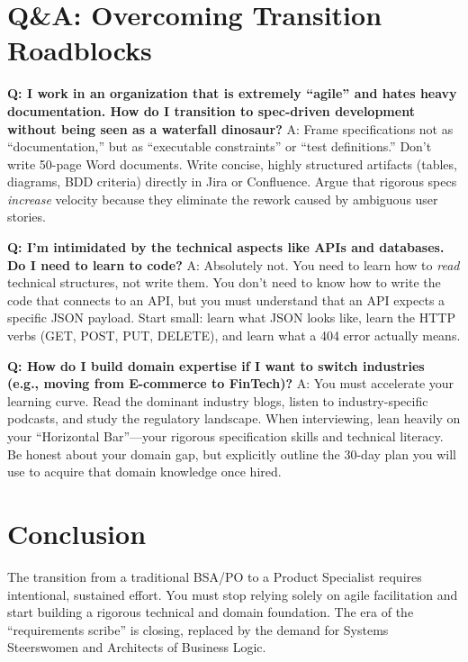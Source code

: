 \section{Q\&A: Overcoming Transition
Roadblocks}\label{qa-overcoming-transition-roadblocks}

\textbf{Q: I work in an organization that is extremely ``agile'' and
hates heavy documentation. How do I transition to spec-driven
development without being seen as a waterfall dinosaur?} A: Frame
specifications not as ``documentation,'' but as ``executable
constraints'' or ``test definitions.'' Don't write 50-page Word
documents. Write concise, highly structured artifacts (tables, diagrams,
BDD criteria) directly in Jira or Confluence. Argue that rigorous specs
\emph{increase} velocity because they eliminate the rework caused by
ambiguous user stories.

\textbf{Q: I'm intimidated by the technical aspects like APIs and
databases. Do I need to learn to code?} A: Absolutely not. You need to
learn how to \emph{read} technical structures, not write them. You don't
need to know how to write the code that connects to an API, but you must
understand that an API expects a specific JSON payload. Start small:
learn what JSON looks like, learn the HTTP verbs (GET, POST, PUT,
DELETE), and learn what a 404 error actually means.

\textbf{Q: How do I build domain expertise if I want to switch
industries (e.g., moving from E-commerce to FinTech)?} A: You must
accelerate your learning curve. Read the dominant industry blogs, listen
to industry-specific podcasts, and study the regulatory landscape. When
interviewing, lean heavily on your ``Horizontal Bar''---your rigorous
specification skills and technical literacy. Be honest about your domain
gap, but explicitly outline the 30-day plan you will use to acquire that
domain knowledge once hired.

\bigskip

\section{Conclusion}\label{conclusion-1}

The transition from a traditional BSA/PO to a Product Specialist
requires intentional, sustained effort. You must stop relying solely on
agile facilitation and start building a rigorous technical and domain
foundation. The era of the ``requirements scribe'' is closing, replaced
by the demand for Systems Steerswomen and Architects of Business Logic.

